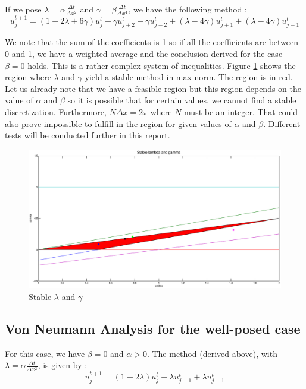If we pose $\lambda = \alpha\frac{\Delta t}{\Delta x^2}$ and $\gamma = \beta \frac{\Delta t}{\Delta x^4}$, we have the following method : 
$$u_j^{t+1} = (1-2\lambda+6\gamma)u_j^t + \gamma u_{j+2}^t + \gamma u_{j-2}^t + (\lambda - 4\gamma)u_{j+1}^t + (\lambda - 4\gamma)u_{j-1}^t$$

We note that the sum of the coefficients is 1 so if all the coefficients are between 0 and 1, we have a weighted average and the conclusion derived for the case $\beta = 0$ holds. This is a rather complex system of inequalities. Figure \ref{reg} shows the region where $\lambda$ and $\gamma$ yield a stable method in max norm. The region is in red. Let us already note that we have a feasible region but this region depends on the value of $\alpha$ and $\beta$ so it is possible that for certain values, we cannot find a stable discretization. Furthermore, $N\Delta x=2\pi$ where $N$ must be an integer. That could also prove impossible to fulfill in the region for given values of $\alpha$ and $\beta$. Different tests will be conducted further in this report.

\begin{figure}
\begin{center}
\includegraphics[scale=0.4]{reg.eps}
\caption{Stable $\lambda$ and $\gamma$}
\label{reg}
\end{center}
\end{figure}




\subsection{Von Neumann Analysis for the well-posed case}
For this case, we have $\beta = 0$ and $\alpha>0$. The method (derived above), with $\lambda = \alpha \frac{\Delta t}{\Delta x^2}$, is given by :
$$u_j^{t+1} = (1-2\lambda)u_j^t+\lambda u_{j+1}^t + \lambda u_{j-1}^t$$

